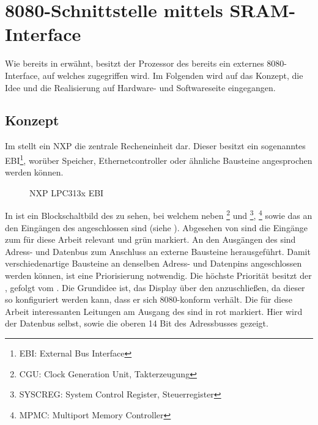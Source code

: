 \section{8080-Schnittstelle mittels SRAM-Interface}
\label{sec:TeilA_8080SRAM}
Wie bereits in  erwähnt, besitzt der Prozessor des  bereits ein externes 8080-Interface, auf welches zugegriffen wird. Im Folgenden wird auf das Konzept, die Idee und die Realisierung auf Hardware- und Softwareseite eingegangen.
\newpage
\subsection{Konzept}
\label{cha:teila_konzept}
Im  stellt ein NXP  die zentrale Recheneinheit dar. Dieser besitzt ein sogenanntes EBI\footnote{EBI: External Bus Interface}, worüber Speicher, Ethernetcontroller oder ähnliche Bausteine angesprochen werden können.

\begin{figure}[htp]
	\centering
{}
	\caption{NXP LPC313x EBI}
	\label{fig:lpc_ebi}
\end{figure}

In  ist ein Blockschaltbild des  zu sehen, bei welchem neben \footnote{CGU: Clock Generation Unit, Takterzeugung} und \footnote{SYSCREG: System Control Register, Steuerregister}, \footnote{MPMC: Multiport Memory Controller} sowie das  an den Eingängen des  angeschlossen sind (siehe \cite{NXP2010}). Abgesehen von  sind die Eingänge zum  für diese Arbeit relevant und grün markiert. An den Ausgängen des  sind Adress- und Datenbus zum Anschluss an externe Bausteine herausgeführt. Damit verschiedenartige Bausteine an denselben Adress- und Datenpins angeschlossen werden können, ist eine Priorisierung notwendig. Die höchste Priorität besitzt der , gefolgt vom . 
Die Grundidee ist, das Display über den  anzuschließen, da dieser so konfiguriert werden kann, dass er sich 8080-konform verhält. Die für diese Arbeit interessanten Leitungen am Ausgang des  sind in  rot markiert. Hier wird der Datenbus selbst, sowie die oberen 14 Bit des Adressbusses gezeigt.


